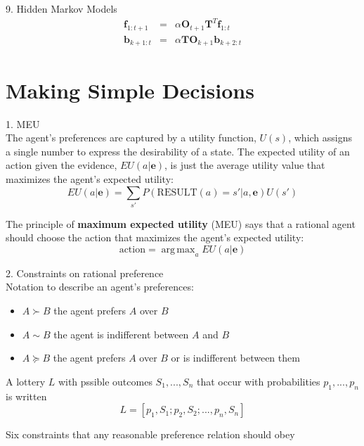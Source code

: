 \documentclass[12pt]{article}
\DeclareMathOperator*{\argmax}{arg\,max}
\begin{document}
9. Hidden Markov Models
\begin{eqnarray*}
\boldsymbol{f}_{1:t+1}
&=& \alpha \boldsymbol{O}_{t+1} \boldsymbol{T}^T \boldsymbol{f}_{1:t} \\
\boldsymbol{b}_{k+1:t}
&=& \alpha \boldsymbol{T} \boldsymbol{O}_{k+1} \boldsymbol{b}_{k+2:t}
\end{eqnarray*}

\section{Making Simple Decisions}

1. MEU \\

The agent's preferences are captured by a utility function, $U(s)$, which assigns a single number to express the desirability of a state. The expected utility of an action given the evidence, $EU(a | \boldsymbol{e})$, is just the average utility value that maximizes the agent's expected utility:
\begin{equation*}
  EU(a | \boldsymbol{e}) 
  = \sum_{s'} P(\text{RESULT}(a) = s'|a,\boldsymbol{e})U(s')
\end{equation*}

The principle of {\bf maximum expected utility} (MEU) says that a rational agent should choose the action that maximizes the agent's expected utility:
\begin{equation*}
  \text{action} = \argmax_a EU(a|\boldsymbol{e})
\end{equation*}

2. Constraints on rational preference \\

Notation to describe an agent's preferences:
\begin{itemize}
  \item $A \succ B$ the agent prefers $A$ over $B$
  \item $A \sim B$ the agent is indifferent between $A$ and $B$
  \item $A \succcurlyeq B$ the agent prefers $A$ over $B$ or is indifferent between them
\end{itemize}

A lottery $L$ with pssible outcomes $S_1,...,S_n$ that occur with probabilities $p_1,...,p_n$ is written
\begin{equation*}
  L = [p_1, S_1; p_2, S_2; ..., p_n,S_n]
\end{equation*}

Six constraints that any reasonable preference relation should obey
\end{document}

